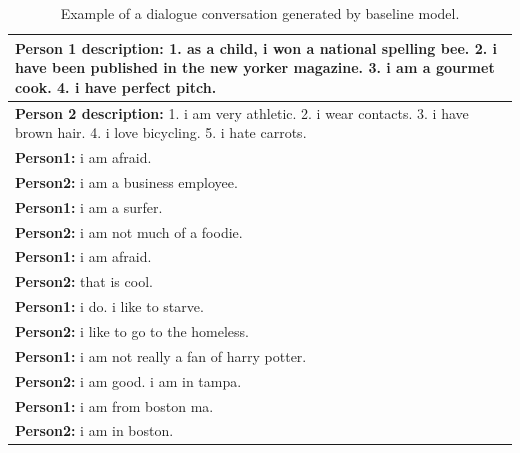 \begin{table}[ht]
\centering
 \begin{tabular}{|p{14cm}|}
 \hline
 \textbf{Person 1 description:} 1. as a child, i won a national spelling bee. 2. i have been published in the new yorker magazine. 3. i am a gourmet cook. 4. i have perfect pitch. \\
 \hline
 \textbf{Person 2 description:} 1. i am very athletic. 2. i wear contacts. 3. i have brown hair. 4. i love bicycling. 5. i hate carrots. \\
 \hline
 \textbf{Person1:} i am afraid. \\
 \textbf{Person2:} i am a business employee.  \\ 
 \textbf{Person1:} i am a surfer. \\
 \textbf{Person2:} i am not much of a foodie. \\
 \textbf{Person1:} i am afraid. \\
 \textbf{Person2:} that is cool. \\
 \textbf{Person1:} i do. i like to starve. \\
 \textbf{Person2:} i like to go to the homeless. \\
 \textbf{Person1:} i am not really a fan of harry potter. \\
 \textbf{Person2:} i am good. i am in tampa. \\
 \textbf{Person1:} i am from boston ma. \\
 \textbf{Person2:} i am in boston. \\
 \hline
 \end{tabular}
 \caption{Example of a dialogue conversation generated by baseline model.}
\label{tab:baseline_experiment}
\end{table}

